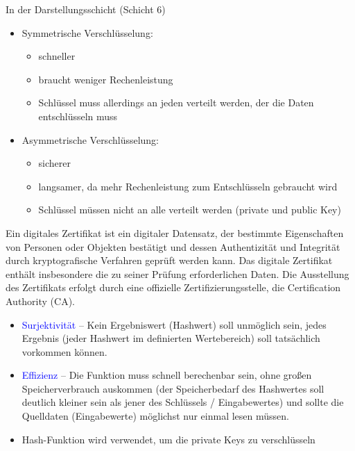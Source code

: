 In der Darstellungsschicht (Schicht 6)

\begin{itemize}
    \item Symmetrische Verschlüsselung:
    \begin{itemize}
        \item schneller
        \item braucht weniger Rechenleistung
        \item Schlüssel muss allerdings an jeden verteilt werden, der die Daten entschlüsseln muss
    \end{itemize}
    \item Asymmetrische Verschlüsselung:
    \begin{itemize}
        \item sicherer
        \item langsamer, da mehr Rechenleistung zum Entschlüsseln gebraucht wird
        \item Schlüssel müssen nicht an alle verteilt werden (private und public Key)
    \end{itemize}
\end{itemize}

Ein digitales Zertifikat ist ein digitaler Datensatz, der bestimmte Eigenschaften von Personen oder Objekten bestätigt und dessen Authentizität und Integrität durch kryptografische Verfahren geprüft werden kann.
Das digitale Zertifikat enthält insbesondere die zu seiner Prüfung erforderlichen Daten.
Die Ausstellung des Zertifikats erfolgt durch eine offizielle Zertifizierungsstelle, die Certification Authority (CA).

\begin{itemize}
    \item \textcolor{blue}{Surjektivität} – Kein Ergebniswert (Hashwert) soll unmöglich sein, jedes Ergebnis (jeder Hashwert im definierten Wertebereich) soll tatsächlich vorkommen können.
    \item \textcolor{blue}{Effizienz} – Die Funktion muss schnell berechenbar sein, ohne großen Speicherverbrauch auskommen (der Speicherbedarf des Hashwertes soll deutlich kleiner sein als jener des Schlüssels / Eingabewertes) und sollte die Quelldaten (Eingabewerte) möglichst nur einmal lesen müssen.
    \item Hash-Funktion wird verwendet, um die private Keys zu verschlüsseln
\end{itemize}

